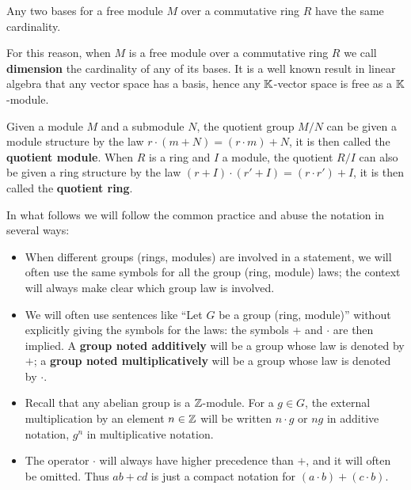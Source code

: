 \begin{proposition}
  Any two bases for a free module $M$ over a commutative ring $R$ have
  the same cardinality.
\end{proposition}

For this reason, when $M$ is a free module over a commutative ring $R$
we call  
\textbf{dimension} the cardinality of
any of its bases. It is a well known result in linear algebra that any
vector space has a basis, hence any $\mathbb{K}$-vector space is free as a
$\mathbb{K}$-module.

Given a module $M$ and a submodule $N$, the quotient group $M/N$ can
be given a module structure by the law $r\cdot(m+N)=(r\cdot m)+N$, it
is then called the \textbf{quotient
  module}. When $R$ is a ring and $I$ a module, the quotient $R/I$ can
also be given a ring structure by the law $(r+I)\cdot(r'+I)=(r\cdot
r')+I$, it is then called the \textbf{quotient
  ring}.

In what follows we will follow the common practice and abuse the
notation in several ways:
\begin{itemize}
\item When different groups (rings, modules) are involved in a
  statement, we will often use the same symbols for all the group
  (ring, module) laws; the context will always make clear which group
  law is involved.
\item We will often use sentences like ``Let $G$ be a group (ring,
  module)'' without explicitly giving the symbols for the laws: the
  symbols $+$ and $\cdot$ are then implied. A
  \textbf{group noted additively} will
  be a group whose law is denoted by $+$; a
  \textbf{group noted
    multiplicatively} will be a group whose law is denoted by $\cdot$.
\item Recall that any abelian group is a $\mathbb{Z}$-module. For a $g\in G$,
  the external multiplication by an element $n\in\mathbb{Z}$ will be written
  $n\cdot g$ or $ng$ in additive notation, $g^n$ in multiplicative
  notation.
\item The operator $\cdot$ will always have higher precedence than
  $+$, and it will often be omitted. Thus $ab+cd$ is just a compact
  notation for $(a\cdot b) + (c\cdot b)$.
\end{itemize}


